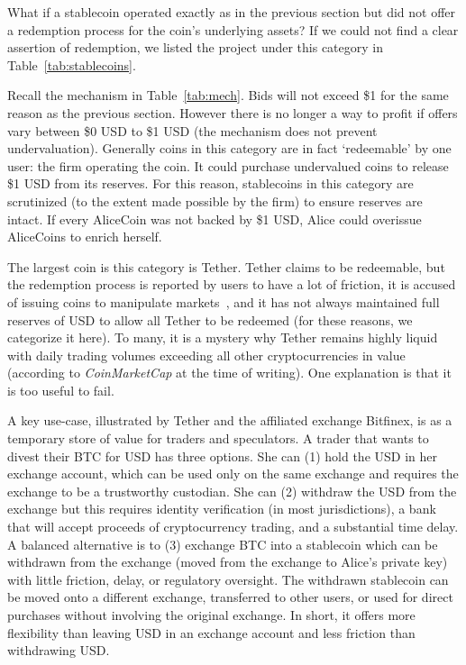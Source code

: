 What if a stablecoin operated exactly as in the previous section but did not offer a redemption process for the coin's underlying assets? If we could not find a clear assertion of redemption, we listed the project under this category in Table~\ref{tab:stablecoins}.

Recall the mechanism in Table~\ref{tab:mech}. Bids will not exceed \$1 for the same reason as the previous section. However there is no longer a way to profit if offers vary between \$0 USD to \$1 USD (\ie the mechanism does not prevent undervaluation). Generally coins in this category are in fact `redeemable' by one user: the firm operating the coin. It could purchase undervalued coins to release \$1 USD from its reserves. For this reason, stablecoins in this category are scrutinized (to the extent made possible by the firm) to ensure reserves are intact. If every AliceCoin was not backed by \$1 USD, Alice could overissue AliceCoins to enrich herself.

The largest coin is this category is Tether. Tether claims to be redeemable, but the redemption process is reported by users to have a lot of friction, it is accused of issuing coins to manipulate markets~\cite{griffin2018bitcoin}, and it has not always maintained full reserves of USD to allow all Tether to be redeemed (for these reasons, we categorize it here). To many, it is a mystery why Tether remains highly liquid with daily trading volumes exceeding all other cryptocurrencies in value (according to \textit{CoinMarketCap} at the time of writing). One explanation is that it is too useful to fail.

A key use-case, illustrated by Tether and the affiliated exchange Bitfinex, is as a temporary store of value for traders and speculators. A trader that wants to divest their BTC for USD has three options. She can (1) hold the USD in her exchange account, which can be used only on the same exchange and requires the exchange to be a trustworthy custodian. She can (2) withdraw the USD from the exchange but this requires identity verification (in most jurisdictions), a bank that will accept proceeds of cryptocurrency trading, and a substantial time delay. A balanced alternative is to (3) exchange BTC into a stablecoin which can be withdrawn from the exchange (\ie moved from the exchange to Alice's private key) with little friction, delay, or regulatory oversight. The withdrawn stablecoin can be moved onto a different exchange, transferred to other users, or used for direct purchases without involving the original exchange. In short, it offers more flexibility than leaving USD in an exchange account and less friction than withdrawing USD.
 
